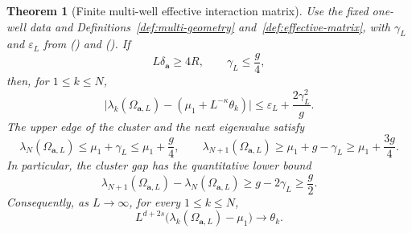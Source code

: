 \documentclass[twoside,10pt]{article}
\numberwithin{equation}{section}
\theoremstyle{slbody}
\newtheorem{theorem}{Theorem}[section]
\theoremstyle{definition}
\newcommand{\abs}[1]{\lvert #1\rvert}
\renewcommand{\eqref}[1]{%
  \textup{{\normalfont(\oldstylenums{\ref{#1}}}\normalfont)}}
\begin{document}
\begin{samepage}
\begin{theorem}[Finite multi-well effective interaction matrix]
\label{thm:multi-well}
Use the fixed one-well data and Definitions~\ref{def:multi-geometry}
and~\ref{def:effective-matrix}, with $\gamma_L$ and $\varepsilon_L$ from
\eqref{eq:gamma-L} and \eqref{eq:compression-error}.  If
\begin{equation}\label{eq:multi-size-conditions}
 L\delta_{\mathbf a}\geq4R,
 \qquad
 \gamma_L\leq\frac g4,
\end{equation}
then, for $1\leq k\leq N$,
\begin{equation}\label{eq:multi-eigenvalue-bound}
 \abs{\lambda_k(\Omega_{\mathbf a,L})
 -(\mu_1+L^{-\kappa}\theta_k)}
 \leq\varepsilon_L+\frac{2\gamma_L^2}{g}.
\end{equation}
The upper edge of the cluster and the next eigenvalue satisfy
\begin{equation}\label{eq:multi-cluster-edges}
 \lambda_N(\Omega_{\mathbf a,L})
 \leq\mu_1+\gamma_L\leq\mu_1+\frac g4,
 \qquad
 \lambda_{N+1}(\Omega_{\mathbf a,L})
 \geq\mu_1+g-\gamma_L\geq\mu_1+\frac{3g}{4}.
\end{equation}
In particular, the cluster gap has the quantitative lower bound
\begin{equation}\label{eq:multi-cluster-gap}
 \lambda_{N+1}(\Omega_{\mathbf a,L})-
 \lambda_N(\Omega_{\mathbf a,L})
 \geq g-2\gamma_L\geq\frac g2.
\end{equation}
Consequently, as $L\to\infty$, for every $1\leq k\leq N$,
\begin{equation}\label{eq:multi-limit}
 L^{d+2s}\bigl(\lambda_k(\Omega_{\mathbf a,L})-\mu_1\bigr)
 \longrightarrow\theta_k.
\end{equation}
\end{theorem}
\end{samepage}
\end{document}
